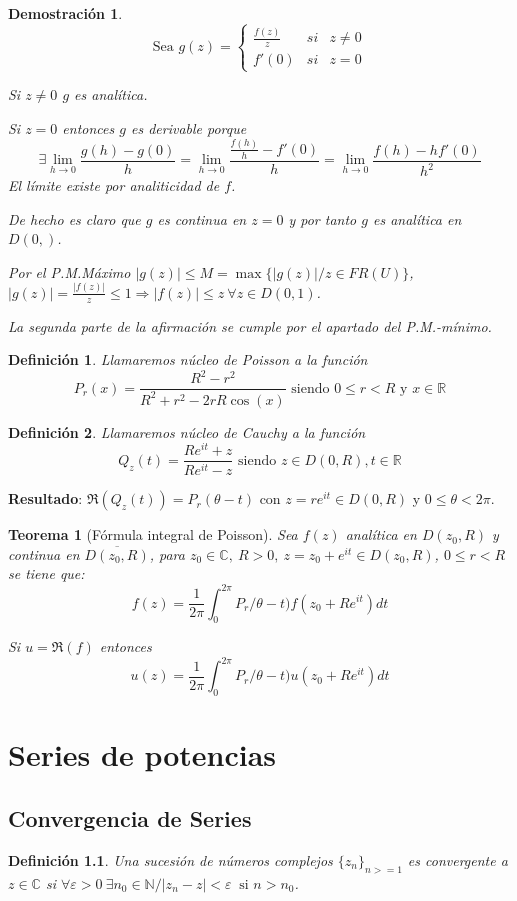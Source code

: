 \documentclass[10pt]{book}
\newtheorem{defi}{Definición}[chapter]
\newtheorem{theorem}{Teorema}[chapter]
\newtheorem*{dem}{Demostración}
\newcommand{\R}{\mathbb{R}}
\newcommand{\C}{\mathbb{C}}
\newcommand{\N}{\mathbb{N}}
\begin{document}
\begin{dem}
$$ \text{Sea } g(z) = \left\lbrace \begin{array}{ccc}
						\frac{f(z)}{z}& si & z\neq 0\\
						f'(0) & si & z=0\end{array}\right.$$

Si $z\neq 0$ $g$ es analítica. 

Si $z=0$ entonces $g$ es derivable porque 
$$\exists \lim_{h\to 0} \frac{g(h)-g(0)}{h} = \lim_{h\to 0} \frac{\frac{f(h)}{h}-f'(0)}{h}= \lim_{h\to 0} \frac{f(h)-hf'(0)}{h^2}$$
El límite existe por analiticidad de $f$.

De hecho es claro que $g$ es continua en $z=0$ y por tanto $g$ es analítica en $D(0,)$.

Por el P.M.Máximo $|g(z) |\leq M = \max\{|g(z)|/ z\in FR(U)\}$, $|g(z)| = \frac{|f(z)|}{z}\leq 1 \Rightarrow |f(z)| \leq z \ \forall z\in D(0,1)$.

La segunda parte de la afirmación se cumple por el apartado del P.M.-mínimo.
\end{dem}

\begin{defi}
Llamaremos núcleo de Poisson a la función 
$$P_r(x) = \frac{R^2-r^2}{R^2+r^2-2rR\cos(x)} \text{ siendo } 0\leq r < R \text{ y } x\in\R$$ 
\end{defi}

\begin{defi}
Llamaremos núcleo de Cauchy a la función 
$$Q_z(t) = \frac{Re^{it}+z}{Re^{it}-z} \text{ siendo } z\in D(0,R), t\in\R$$ 
\end{defi}
\textbf{Resultado}: $\Re(Q_z(t)) = P_r(\theta-t)$ con $z= re^{it}\in D(0,R)$ y $0\leq \theta < 2\pi$.



\begin{theorem}[Fórmula integral de Poisson]
Sea $f(z)$ analítica en $D(z_0,R)$ y continua en $\overline{D(z_0,R)}$, para $z_0\in\C,\ R>0,\ z= z_0+e^{it}\in D(z_0,R)$, $0\leq r<R$ se tiene que:
$$f(z) = \frac{1}{2\pi}\int_0^{2\pi} P_r/\theta-t)f(z_0+Re^{it})dt$$

Si $u = \Re(f)$ entonces $$u(z) = \frac{1}{2\pi}\int_0^{2\pi} P_r/\theta-t)u(z_0+Re^{it})dt$$
\end{theorem}


\chapter{Series de potencias}
\section{Convergencia de Series}
\begin{defi}
Una sucesión de números complejos $\{z_n\}_{n>=1}$ es convergente a $z\in\C$ si $\forall\varepsilon>0 \ \exists n_0\in\N / |z_n-z|<\varepsilon\ \text{ si } n>n_0$.
\end{defi}
\end{document}
